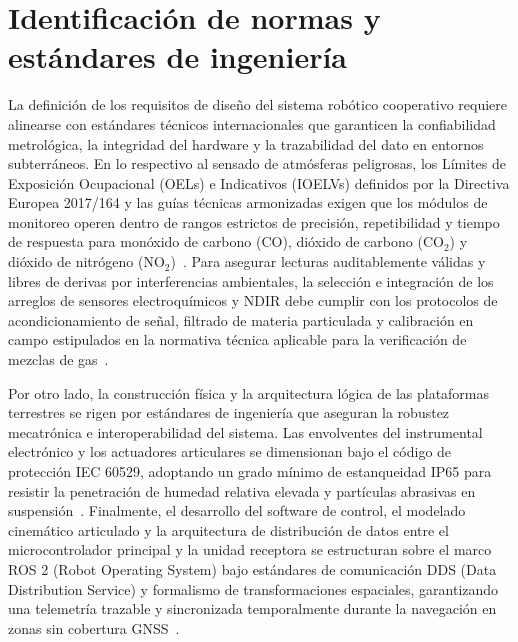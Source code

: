 \section{Identificación de normas y estándares de ingeniería}
\hspace{1.25cm}
La definición de los requisitos de diseño del sistema robótico cooperativo requiere alinearse con estándares técnicos internacionales que garanticen la confiabilidad metrológica, la integridad del hardware y la trazabilidad del dato en entornos subterráneos. En lo respectivo al sensado de atmósferas peligrosas, los Límites de Exposición Ocupacional (OELs) e Indicativos (IOELVs) definidos por la Directiva Europea 2017/164 y las guías técnicas armonizadas exigen que los módulos de monitoreo operen dentro de rangos estrictos de precisión, repetibilidad y tiempo de respuesta para monóxido de carbono (CO), dióxido de carbono ($\text{CO}_2$) y dióxido de nitrógeno ($\text{NO}_2$)~\cite{EU_ExposureDirective_2020,Deveau2015_OEL}. Para asegurar lecturas auditablemente válidas y libres de derivas por interferencias ambientales, la selección e integración de los arreglos de sensores electroquímicos y NDIR debe cumplir con los protocolos de acondicionamiento de señal, filtrado de materia particulada y calibración en campo estipulados en la normativa técnica aplicable para la verificación de mezclas de gas~\cite{Cepa2023_sensors,EU_ExposureDirective_2020}.

\hspace{1.25cm}
Por otro lado, la construcción física y la arquitectura lógica de las plataformas terrestres se rigen por estándares de ingeniería que aseguran la robustez mecatrónica e interoperabilidad del sistema. Las envolventes del instrumental electrónico y los actuadores articulares se dimensionan bajo el código de protección IEC 60529, adoptando un grado mínimo de estanqueidad IP65 para resistir la penetración de humedad relativa elevada y partículas abrasivas en suspensión~\cite{OSINERGMIN_BoletinGSM_2020}. Finalmente, el desarrollo del software de control, el modelado cinemático articulado y la arquitectura de distribución de datos entre el microcontrolador principal y la unidad receptora se estructuran sobre el marco ROS 2 (Robot Operating System) bajo estándares de comunicación DDS (Data Distribution Service) y formalismo de transformaciones espaciales, garantizando una telemetría trazable y sincronizada temporalmente durante la navegación en zonas sin cobertura GNSS~\cite{siciliano2010robotics,KimChoi_2025_MineMapping}.

